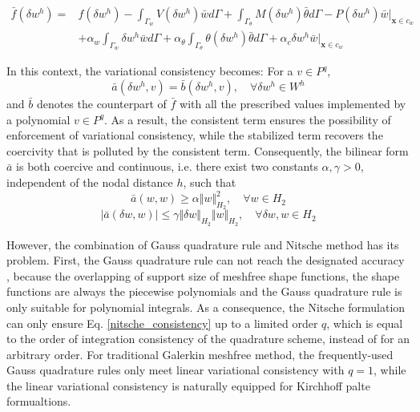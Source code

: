 \begin{equation}\label{nitsche_linear}
	\begin{aligned}
		\bar f(\delta w^h) ={}& f(\delta w^h)
		- \int_{\Gamma_{w}} V(\delta w^h) \bar w d\Gamma
		+ \int_{\Gamma_{\theta}} M(\delta w^h) \bar \theta d\Gamma
		- P(\delta w^h) \bar w \vert_{\boldsymbol x \in c_w} \\
		&+ \alpha_w \int_{\Gamma_{w}} \delta w^h \bar w d\Gamma
		+ \alpha_\theta \int_{\Gamma_{\theta}} \theta(\delta w^h) \bar \theta d\Gamma
		+ \alpha_c \delta w^h \bar w \vert_{\boldsymbol x \in c_w}
	\end{aligned}
\end{equation}

In this context, the variational consistency becomes:
For a $v\in P^q$,
\begin{equation}\label{nitsche_consistency}
	\bar a(\delta w^h, v) = \bar b(\delta w^h, v), \quad \forall \delta w^h \in W^h
\end{equation}
and $\bar b$ denotes the counterpart of $\bar f$ with all the prescribed values implemented by a polynomial $v\in P^q$.
As a result, the consistent term ensures the possibility of enforcement of variational consistency, while the stabilized term recovers the coercivity that is polluted by the consistent term.
Consequently, the bilinear form $\bar a$ is both coercive and continuous, i.e. there exist two constants $\alpha,\gamma>0$, independent of the nodal distance $h$, such that
\begin{equation}\label{nitsche_stability}
	\bar a(w, w)\ge\alpha\Vert w \Vert_{H_2}^2,\quad \forall w\in H_2
\end{equation}
\begin{equation}\label{nitsche_continuity}
	\left|\bar a(\delta w, w)\right|\le\gamma\Vert \delta w \Vert_{H_2}\Vert w \Vert_{H_2},\quad \forall \delta w, w\in H_2
\end{equation}

However, the combination of Gauss quadrature rule and Nitsche method has its problem.
First, the Gauss quadrature rule can not reach the designated accuracy \cite{}, because the overlapping of support size of meshfree shape functions, the shape functions are always the piecewise polynomials and the Gauss quadrature rule is only suitable for polynomial integrals.
As a consequence, the Nitsche formulation can only ensure Eq. \eqref{nitsche_consistency} up to a limited order $q$, which is equal to the order of integration consistency of the quadrature scheme, instead of for an arbitrary order.
For traditional Galerkin meshfree method, the frequently-used Gauss quadrature rules only meet linear variational consistency with $q=1$, while the linear variational consistency is naturally equipped for Kirchhoff palte formualtions.

